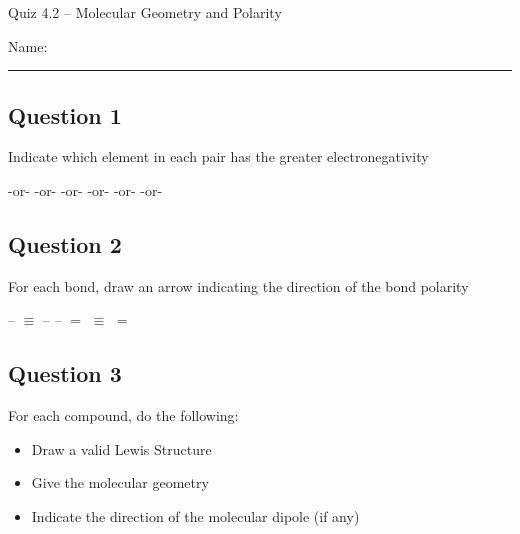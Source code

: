 \documentclass[11pt, letterpaper]{memoir}
\begin{document}
	\begin{center}
		{\large Quiz 4.2 --	Molecular Geometry and Polarity}
	\end{center}
	{\large Name: \rule[-1mm]{4in}{.1pt} 

\subsection*{Question 1}
Indicate which element in each pair has the greater electronegativity

{\large {} -or-  \hspace{3em}  -or-  \hspace{3em}  -or-  \hspace{3em}  -or-  \hspace{3em}  -or-  \hspace{3em}  -or- }

\vspace{1em}
\subsection*{Question 2}
For each bond, draw an arrow indicating the direction of the bond polarity

{\large {}-- \hspace{4em} $\equiv$ \hspace{4em} -- \hspace{4em} -- \hspace{4em} $=$ \hspace{4em} $\equiv$ \hspace{4em} $=$}

\vspace{1em}
\subsection*{Question 3}
For each compound, do the following:
\begin{itemize}
	\item Draw a valid Lewis Structure
	\item Give the molecular geometry
	\item Indicate the direction of the molecular dipole (if any)
\end{itemize}

\begin{minipage}{0.49\linewidth}
	

\end{minipage}}
\end{document}
